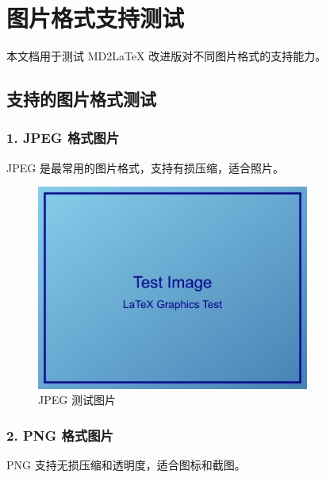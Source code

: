\documentclass[UTF8, a4paper, 12pt]{ctexart}
\begin{document}
\section{图片格式支持测试}


本文档用于测试 MD2LaTeX 改进版对不同图片格式的支持能力。


\subsection{支持的图片格式测试}


\subsubsection{1. JPEG 格式图片}


JPEG 是最常用的图片格式，支持有损压缩，适合照片。


\begin{figure}[H]
    \centering
    \includegraphics[width=0.8\textwidth]{../../tests/images/test_image.jpg}
    \caption{JPEG 测试图片}
    \label{fig:jpeg_____}
\end{figure}



\subsubsection{2. PNG 格式图片}


PNG 支持无损压缩和透明度，适合图标和截图。
\end{document}
